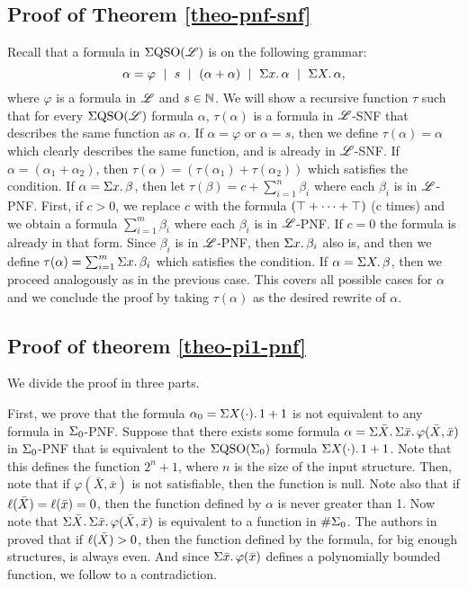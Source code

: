 \subsection*{Proof of Theorem \ref{theo-pnf-snf}}
Recall that a formula in $\Sigma{\rm QSO}(\mathscr{L})$ is on the following grammar:
$$
\alpha = \varphi \ \mid \ s \ \mid \ (\alpha + \alpha) \ \mid \ \sa{x} \alpha \ \mid \ \sa{X} \alpha,
$$
where $\varphi$ is a formula in $\mathscr{L}$ and $s\in\mathbb{N}$. We will show a recursive function $\tau$ such that for every $\Sigma{\rm QSO}(\mathscr{L})$ formula $\alpha$, $\tau(\alpha)$ is a formula in $\mathscr{L}$-SNF that describes the same function as $\alpha$. If $\alpha = \varphi$ or $\alpha = s$, then we define $\tau(\alpha) = \alpha$ which clearly describes the same function, and is already in $\mathscr{L}$-SNF. If $\alpha = (\alpha_1 + \alpha_2)$, then $\tau(\alpha) = (\tau(\alpha_1) + \tau(\alpha_2))$ which satisfies the condition. If $\alpha = \Sigma{x}.\,\beta$, then let $\tau(\beta) = c + \sum_{i = 1}^{n}\beta_i$ where each $\beta_i$ is in $\mathscr{L}$-PNF. First, if $c > 0$, we replace $c$ with the formula $(\top + \cdots + \top)$ (c times) and we obtain a formula $\sum_{i = 1}^{m}\beta_i$ where each $\beta_i$ is in $\mathscr{L}$-PNF. If $c = 0$ the formula is already in that form. Since $\beta_i$ is in $\mathscr{L}$-PNF, then $\Sigma{x}.\,\beta_i$ also is, and then we define $\tau(\alpha) = \sum_{i = 1}^{m}\Sigma{x}.\,\beta_i$ which satisfies the condition. If $\alpha = \Sigma{X}.\,\beta$, then we proceed analogously as in the previous case. This covers all possible cases for $\alpha$ and we conclude the proof by taking $\tau(\alpha)$ as the desired rewrite of $\alpha$.

\subsection*{Proof of theorem \ref{theo-pi1-pnf}}
We divide the proof in three parts.

\vspace{1em}
First, we prove that the formula $\alpha_{0} = \Sigma{X(\cdot)}.\,1 + 1$ is not equivalent to any formula in $\Sigma_{0}$-PNF. Suppose that there exists some formula $\alpha = \Sigma{\bar{X}}.\,\Sigma{\bar{x}}.\,\varphi(\bar{X},\bar{x})$ in $\Sigma_{0}$-PNF that is equivalent to the $\Sigma{\rm QSO}(\Sigma_{0})$ formula $\Sigma{X(\cdot)}.\,1 + 1$. Note that this defines the function $2^{n}+1$, where $n$ is the size of the input structure. Then, note that if $\varphi(\bar{X},\bar{x})$ is not satisfiable, then the function is null. Note also that if $\ell(\bar{X}) = \ell(\bar{x}) = 0$, then the function defined by $\alpha$ is never greater than 1. Now note that $\Sigma{\bar{X}}.\,\Sigma{\bar{x}}.\,\varphi(\bar{X},\bar{x})$ is equivalent to a function in $\#\Sigma_{0}$. The authors in \cite{SalujaST95} proved that if $\ell(\bar{X}) > 0$, then the function defined by the formula, for big enough structures, is always even. And since $\Sigma{\bar{x}}.\,\varphi(\bar{x})$ defines a polynomially bounded function, we follow to a contradiction.

